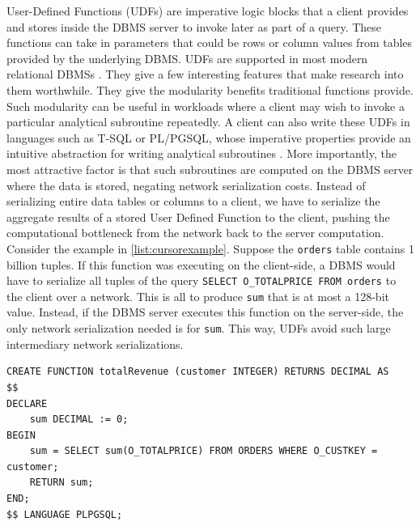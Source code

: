 \documentclass[12pt]{cmuthesis}
\begin{document}
User-Defined Functions (UDFs) are imperative logic blocks that a client provides and stores inside the DBMS server to invoke later as part of a query. These functions can take in parameters that could be rows or column values from tables provided by the underlying DBMS. UDFs are supported in most modern relational DBMSs \cite{pgSql, sqlServer, oracle}. They give a few interesting features that make research into them worthwhile. They give the modularity benefits traditional functions provide. Such modularity can be useful in workloads where a client may wish to invoke a particular analytical subroutine repeatedly.  A client can also write these UDFs in languages such as T-SQL or PL/PGSQL, whose imperative properties provide an intuitive abstraction for writing analytical subroutines \cite{ramachandra19}. More importantly, the most attractive factor is that such subroutines are computed on the DBMS server where the data is stored, negating network serialization costs. Instead of serializing entire data tables or columns to a client, we have to serialize the aggregate results of a stored User Defined Function to the client, pushing the computational bottleneck from the network back to the server computation. Consider the example in \cref{list:cursorexample}. Suppose the \texttt{orders} table contains 1 billion tuples. If this function was executing on the client-side, a DBMS would have to serialize all tuples of the query \texttt{SELECT O\_TOTALPRICE FROM orders} to the client over a network. This is all to produce \texttt{sum} that is at most a 128-bit value. Instead, if the DBMS server executes this function on the server-side, the only network serialization needed is for \texttt{sum}. This way, UDFs avoid such large intermediary network serializations.\\


    \begin{listing}
        \begin{verbatim}
CREATE FUNCTION totalRevenue (customer INTEGER) RETURNS DECIMAL AS 
$$
DECLARE
    sum DECIMAL := 0;
BEGIN
    sum = SELECT sum(O_TOTALPRICE) FROM ORDERS WHERE O_CUSTKEY = customer;
    RETURN sum;
END;
$$ LANGUAGE PLPGSQL;
        \end{verbatim}
        \caption{Example of UDF that returns the sum of total prices for all tuples whose \texttt{O\_CUSTKEY} is equal to the input parameter from the TPC-H \texttt{orders} table}
        \label{list:udfexample}
        \end{listing}
\end{document}
